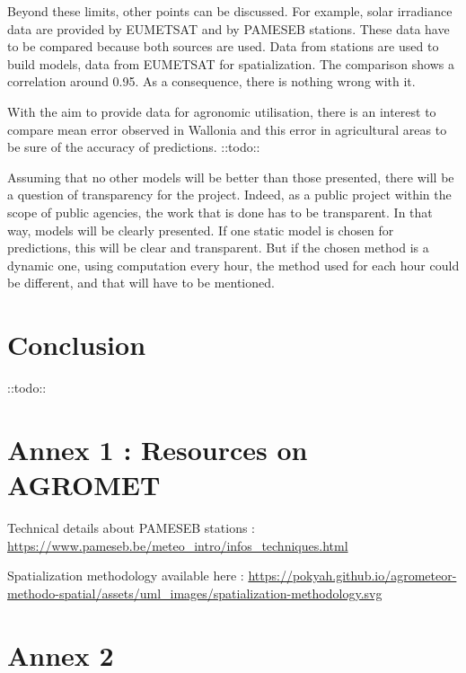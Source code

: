 \documentclass[12pt,twoside]{reedthesis}
\theoremstyle{definition}
\theoremstyle{definition}
\theoremstyle{definition}
\theoremstyle{remark}
\begin{document}
Beyond these limits, other points can be discussed. For example, solar
irradiance data are provided by EUMETSAT and by PAMESEB stations. These
data have to be compared because both sources are used. Data from
stations are used to build models, data from EUMETSAT for
spatialization. The comparison shows a correlation around 0.95. As a
consequence, there is nothing wrong with it.

With the aim to provide data for agronomic utilisation, there is an
interest to compare mean error observed in Wallonia and this error in
agricultural areas to be sure of the accuracy of predictions. ::todo::

Assuming that no other models will be better than those presented, there
will be a question of transparency for the project. Indeed, as a public
project within the scope of public agencies, the work that is done has
to be transparent. In that way, models will be clearly presented. If one
static model is chosen for predictions, this will be clear and
transparent. But if the chosen method is a dynamic one, using
computation every hour, the method used for each hour could be
different, and that will have to be mentioned.

\chapter*{Conclusion}\label{conclusion}

::todo::

\appendix

\chapter{Annex 1 : Resources on
AGROMET}\label{annex-1-resources-on-agromet}

Technical details about PAMESEB stations :
\url{https://www.pameseb.be/meteo_intro/infos_techniques.html}

Spatialization methodology available here :
\url{https://pokyah.github.io/agrometeor-methodo-spatial/assets/uml_images/spatialization-methodology.svg}

\chapter{Annex 2}\label{annex-2}
\end{document}
